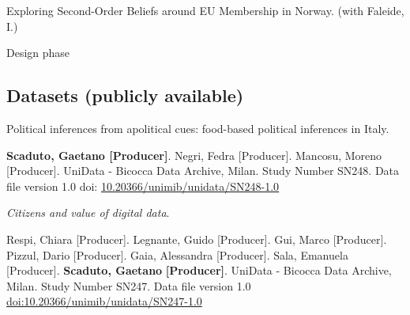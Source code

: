 \documentclass[10pt,]{article}
\providecommand{\tightlist}{%
  \setlength{\itemsep}{0pt}\setlength{\parskip}{0pt}}
\renewenvironment{itemize}{
  \begin{list}{}{
    \setlength{\leftmargin}{1.5em}
  }
}{
  \end{list}
}
\begin{document}
\begin{enumerate}
\def\labelenumi{\arabic{enumi}.}
\tightlist
\item
  Exploring Second-Order Beliefs around EU Membership in Norway. (with
  Faleide, I.)

  \begin{itemize}
  \tightlist
  \item
    Design phase
  \end{itemize}
\end{enumerate}

\subsection{Datasets (publicly
available)}\label{datasets-publicly-available}

\begin{enumerate}
\def\labelenumi{\arabic{enumi}.}
\setcounter{enumi}{1}
\tightlist
\item
  Political inferences from apolitical cues: food-based political
  inferences in Italy.

  \begin{itemize}
  \tightlist
  \item
    \textbf{Scaduto, Gaetano {[}Producer{]}}. Negri, Fedra
    {[}Producer{]}. Mancosu, Moreno {[}Producer{]}. UniData - Bicocca
    Data Archive, Milan. Study Number SN248. Data file version 1.0 doi:
    \href{https://www.unidata.unimib.it/?indagine=political-inferences-from-apolitical-cues-food-based-political-inferences-in-italy-2023}{10.20366/unimib/unidata/SN248-1.0}
  \end{itemize}
\end{enumerate}

\begin{enumerate}
\def\labelenumi{\arabic{enumi}.}
\tightlist
\item
  \emph{Citizens and value of digital data}.

  \begin{itemize}
  \tightlist
  \item
    Respi, Chiara {[}Producer{]}. Legnante, Guido {[}Producer{]}. Gui,
    Marco {[}Producer{]}. Pizzul, Dario {[}Producer{]}. Gaia, Alessandra
    {[}Producer{]}. Sala, Emanuela {[}Producer{]}. \textbf{Scaduto,
    Gaetano} \textbf{{[}Producer{]}}. UniData - Bicocca Data Archive,
    Milan. Study Number SN247. Data file version 1.0
    \href{http://dx.doi.org/10.20366/unimib/unidata/SN247-1.0}{doi:10.20366/unimib/unidata/SN247-1.0}
  \end{itemize}
\end{enumerate}
\end{document}
